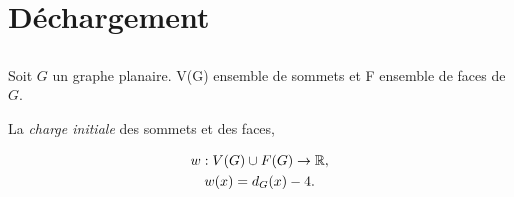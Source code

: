 \documentclass{beamer}
\begin{document}
%
%
%

%
% 
%

%

\section{Déchargement}
\subsection{ }
\begin{frame}
Soit $G$ un graphe planaire. V(G) ensemble de sommets et F ensemble de faces de $G$.

La \emph{charge initiale} des sommets et des faces,

$$
\gathered
w: V(G)\cup F(G) \to \mathbb{R}, \\
w(x) = d_G(x) - 4. \\
\endgathered
$$
\end{frame}
\end{document}
